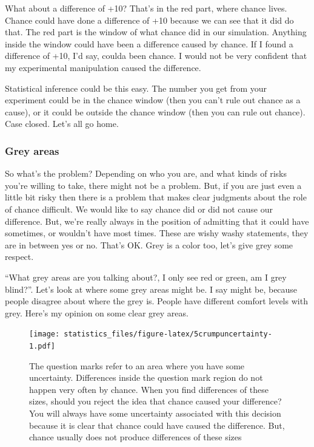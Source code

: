 \documentclass[]{book}
\begin{document}
What about a difference of +10? That's in the red part, where chance lives. Chance could have done a difference of +10 because we can see that it did do that. The red part is the window of what chance did in our simulation. Anything inside the window could have been a difference caused by chance. If I found a difference of +10, I'd say, coulda been chance. I would not be very confident that my experimental manipulation caused the difference.

Statistical inference could be this easy. The number you get from your experiment could be in the chance window (then you can't rule out chance as a cause), or it could be outside the chance window (then you can rule out chance). Case closed. Let's all go home.

\hypertarget{grey-areas}{%
\subsubsection{Grey areas}\label{grey-areas}}

So what's the problem? Depending on who you are, and what kinds of risks you're willing to take, there might not be a problem. But, if you are just even a little bit risky then there is a problem that makes clear judgments about the role of chance difficult. We would like to say chance did or did not cause our difference. But, we're really always in the position of admitting that it could have sometimes, or wouldn't have most times. These are wishy washy statements, they are in between yes or no. That's OK. Grey is a color too, let's give grey some respect.

``What grey areas are you talking about?, I only see red or green, am I grey blind?''. Let's look at where some grey areas might be. I say might be, because people disagree about where the grey is. People have different comfort levels with grey. Here's my opinion on some clear grey areas.

\begin{figure}
\centering
\texttt{[image: statistics\_files/figure-latex/5crumpuncertainty-1.pdf]}
\caption{\label{fig:5crumpuncertainty}The question marks refer to an area where you have some uncertainty. Differences inside the question mark region do not happen very often by chance. When you find differences of these sizes, should you reject the idea that chance caused your difference? You will always have some uncertainty associated with this decision because it is clear that chance could have caused the difference. But, chance usually does not produce differences of these sizes}
\end{figure}
\end{document}
